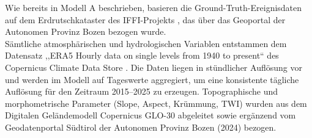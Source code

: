\documentclass[../main.tex]{subfiles}
\begin{document}
Wie bereits in Modell A beschrieben, basieren die Ground-Truth-Ereignisdaten auf dem Erdrutschkataster des IFFI-Projekts \autocite{trigilaQualityAssessmentItalian2010}, das über das Geoportal der Autonomen Provinz Bozen bezogen wurde.\\

Sämtliche atmosphärischen und hydrologischen Variablen entstammen dem Datensatz ,,ERA5 Hourly data on single levels from 1940 to present`` des Copernicus Climate Data Store \autocite{ERA5HourlyData}. Die Daten liegen in stündlicher Auflösung vor und werden im Modell auf Tageswerte aggregiert, um eine konsistente tägliche Auflösung für den Zeitraum 2015--2025 zu erzeugen. Topographische und morphometrische Parameter (Slope, Aspect, Krümmung, TWI) wurden aus dem Digitalen Geländemodell Copernicus GLO-30 abgeleitet \autocite{opentopographyCopernicusGLO90Digital2021} sowie ergänzend vom Geodatenportal Südtirol der Autonomen Provinz Bozen (2024) bezogen.
\end{document}
